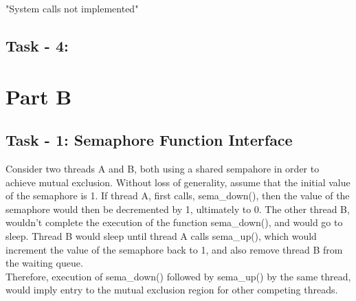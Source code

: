 \documentclass[12pt]{article}
\begin{document}
"System calls not implemented"\\

\subsection*{Task - 4:}

\section*{Part B}

\subsection*{Task - 1: Semaphore Function Interface}

Consider two threads A and B, both using a shared sempahore in order 
to achieve mutual exclusion. Without loss of generality, assume that 
the initial value of the semaphore is 1. If thread A, first calls, 
sema\_down(), then the value of the semaphore would then be 
decremented by 1, ultimately to 0. The other thread B, wouldn't 
complete the execution of the function sema\_down(), and would go 
to sleep. Thread B would sleep until thread A calls sema\_up(), which
would increment the value of the semaphore back to 1, and also remove
thread B from the waiting queue. \\

\noindent
Therefore, execution of sema\_down() followed by sema\_up() by the
same thread, would imply entry to the mutual exclusion region for other
competing threads.




\end{document}
